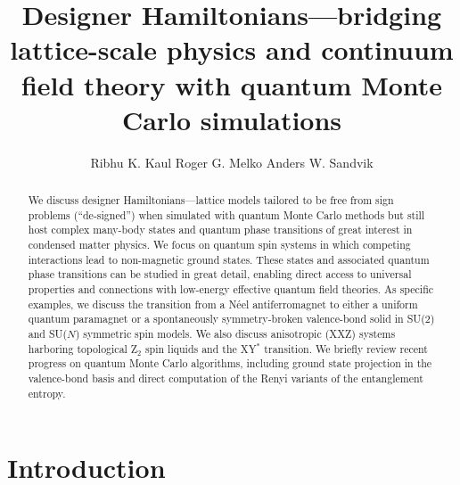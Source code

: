 \documentclass[range]{ar2e}
\begin{document}




\title{Designer Hamiltonians---bridging lattice-scale physics and continuum field theory with 
quantum Monte Carlo simulations} 

\author{Ribhu K. Kaul
Roger G. Melko
Anders W. Sandvik
}

\begin{abstract}
We discuss designer Hamiltonians---lattice models tailored to be free from sign problems (``de-signed'') when simulated with quantum 
Monte Carlo methods but still host complex  many-body states and quantum phase transitions of great interest in condensed matter 
physics. We focus on quantum spin systems in which competing interactions lead to non-magnetic ground states. These states and 
associated quantum phase transitions can be studied in great detail, enabling direct access to universal properties and connections 
with low-energy effective quantum field theories. As specific examples, we discuss the transition from a N\'eel antiferromagnet to 
either a uniform quantum paramagnet or a spontaneously symmetry-broken valence-bond solid in SU($2$) and SU($N$) symmetric spin models. 
We also discuss anisotropic (XXZ) systems harboring topological Z$_2$ spin liquids and the XY$^*$ transition. We briefly review recent 
progress on quantum Monte Carlo algorithms, including ground state projection in the valence-bond basis and direct computation 
of the Renyi variants of the entanglement entropy.
\end{abstract}

\maketitle

\section{Introduction}
\label{sec:intro}
\end{document}
